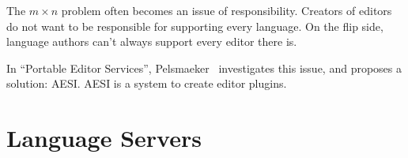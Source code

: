 The $m \times n$ problem often becomes an issue of responsibility.
Creators of editors do not want to be responsible for supporting every language.
On the flip side, language authors can't always support every editor there is.

In ``Portable Editor Services'', Pelsmaeker~\autocite*{Pelsmaeker2018} investigates this issue, and proposes a solution: \ac{AESI}.
\ac{AESI} is a system to create editor plugins.


\section{Language Servers}\label{sec:language-servers}